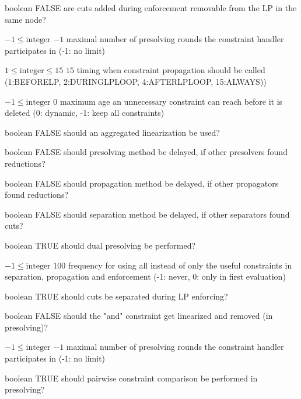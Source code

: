 %
{boolean}%
{FALSE}%
{are cuts added during enforcement removable from the LP in the same node?}%
{}

%
{$-1\leq\textrm{integer}$}%
{$-1$}%
{maximal number of presolving rounds the constraint handler participates in (-1: no limit)}%
{}

%
{$1\leq\textrm{integer}\leq15$}%
{$15$}%
{timing when constraint propagation should be called (1:BEFORELP, 2:DURINGLPLOOP, 4:AFTERLPLOOP, 15:ALWAYS))}%
{}

%
{$-1\leq\textrm{integer}$}%
{$0$}%
{maximum age an unnecessary constraint can reach before it is deleted (0: dynamic, -1: keep all constraints)}%
{}

%
{boolean}%
{FALSE}%
{should an aggregated linearization be used?}%
{}

%
{boolean}%
{FALSE}%
{should presolving method be delayed, if other presolvers found reductions?}%
{}

%
{boolean}%
{FALSE}%
{should propagation method be delayed, if other propagators found reductions?}%
{}

%
{boolean}%
{FALSE}%
{should separation method be delayed, if other separators found cuts?}%
{}

%
{boolean}%
{TRUE}%
{should dual presolving be performed?}%
{}

%
{$-1\leq\textrm{integer}$}%
{$100$}%
{frequency for using all instead of only the useful constraints in separation, propagation and enforcement (-1: never, 0: only in first evaluation)}%
{}

%
{boolean}%
{TRUE}%
{should cuts be separated during LP enforcing?}%
{}

%
{boolean}%
{FALSE}%
{should the "and" constraint get linearized and removed (in presolving)?}%
{}

%
{$-1\leq\textrm{integer}$}%
{$-1$}%
{maximal number of presolving rounds the constraint handler participates in (-1: no limit)}%
{}

%
{boolean}%
{TRUE}%
{should pairwise constraint comparison be performed in presolving?}%
{}

